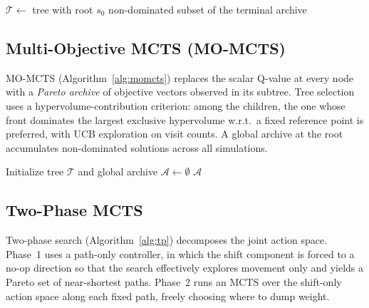 \begin{algorithm}[h]
\SetAlgoLined
{}
$\mathcal{T} \leftarrow$ tree with root $s_0$\;
\Return non-dominated subset of the terminal archive\;
\caption{MCTS for PIE}
\label{alg:mcts}
\end{algorithm}

\subsection{Multi-Objective MCTS (MO-MCTS)}
\label{sec:mo_mcts}
MO-MCTS (Algorithm~\ref{alg:momcts}) replaces the scalar Q-value at every node with a \emph{Pareto archive} of objective vectors observed in its subtree. Tree selection uses a hypervolume-contribution criterion: among the children, the one whose front dominates the largest exclusive hypervolume w.r.t.\ a fixed reference point is preferred, with UCB exploration on visit counts. A global archive at the root accumulates non-dominated solutions across all simulations.

\begin{algorithm}[h]
\SetAlgoLined
{}
Initialize tree $\mathcal{T}$ and global archive $\mathcal{A} \leftarrow \emptyset$\;
\Return $\mathcal{A}$\;
\caption{Multi-Objective MCTS}
\label{alg:momcts}
\end{algorithm}

\subsection{Two-Phase MCTS}
\label{sec:two_phase}
Two-phase search (Algorithm~\ref{alg:tp}) decomposes the joint action space. Phase~1 uses a path-only controller, in which the shift component is forced to a no-op direction so that the search effectively explores movement only and yields a Pareto set of near-shortest paths. Phase~2 runs an MCTS over the shift-only action space along each fixed path, freely choosing where to dump weight.

